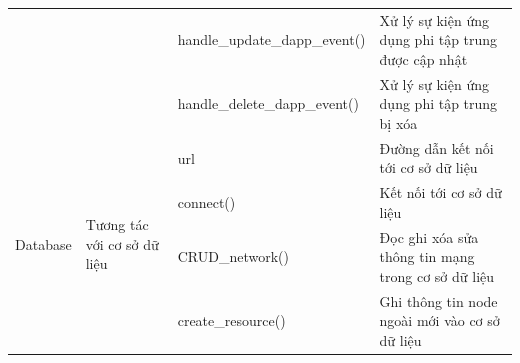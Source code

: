 \documentclass[../DoAn.tex]{subfiles}
\begin{document}
\begin{longtable}{|p{}|p{}|p{}|p{}|}
                                                   &                                                                                    & \hspace{0pt}handle\_\hspace{0pt}update\_\hspace{0pt}dapp\_\hspace{0pt}event()     & Xử lý sự kiện ứng dụng phi tập trung được cập nhật                                           \\ \cline{3-4}
                                                   &                                                                                    & \hspace{0pt}handle\_\hspace{0pt}delete\_\hspace{0pt}dapp\_\hspace{0pt}event()     & Xử lý sự kiện ứng dụng phi tập trung bị xóa                                                  \\ \hline
    \multirow[t]{5}{0.175\textwidth}{Database}     & \multirow[t]{5}{0.175\textwidth}{Tương tác với cơ sở dữ liệu}                      & \hspace{0pt}url                                                                   & Đường dẫn kết nối tới cơ sở dữ liệu                                                          \\ \cline{3-4}
                                                   &                                                                                    & \hspace{0pt}connect\hspace{0pt}()                                                 & Kết nối tới cơ sở dữ liệu                                                                    \\ \cline{3-4}
                                                   &                                                                                    & \hspace{0pt}CRUD\_network\hspace{0pt}()                                           & Đọc ghi xóa sửa thông tin mạng trong cơ sở dữ liệu                                           \\ \cline{3-4}
                                                   &                                                                                    & \hspace{0pt}create\_resource\hspace{0pt}()                                        & Ghi thông tin node ngoài mới vào cơ sở dữ liệu                                               \\ \cline{3-4}

\end{longtable}
\end{document}
